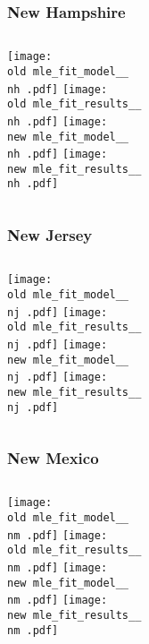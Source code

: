 \documentclass{beamer}
\newcommand{\old}{api-370-prod/pyseir/state_summaries/reports/}
\newcommand{\new}{new/pyseir/state_summaries/reports/}
\newcommand{\nh}{New Hampshire__33}
\newcommand{\nj}{New Jersey__34}
\newcommand{\nm}{New Mexico__35}
\begin{document}
\begin{frame}
\frametitle{New Hampshire}
    \begin{columns}[t]

       \texttt{[image: \\old mle\_fit\_model\_\_\\nh .pdf]}
       \texttt{[image: \\old mle\_fit\_results\_\_\\nh .pdf]}   
       \texttt{[image: \\new mle\_fit\_model\_\_\\nh .pdf]}
       \texttt{[image: \\new mle\_fit\_results\_\_\\nh .pdf]}   
\end{columns}
\end{frame}

\begin{frame}
\frametitle{New Jersey}
    \begin{columns}[t]

       \texttt{[image: \\old mle\_fit\_model\_\_\\nj .pdf]}
       \texttt{[image: \\old mle\_fit\_results\_\_\\nj .pdf]}   
       \texttt{[image: \\new mle\_fit\_model\_\_\\nj .pdf]}
       \texttt{[image: \\new mle\_fit\_results\_\_\\nj .pdf]}   
\end{columns}
\end{frame}

\begin{frame}
\frametitle{New Mexico}
    \begin{columns}[t]

       \texttt{[image: \\old mle\_fit\_model\_\_\\nm .pdf]}
       \texttt{[image: \\old mle\_fit\_results\_\_\\nm .pdf]}   
       \texttt{[image: \\new mle\_fit\_model\_\_\\nm .pdf]}
       \texttt{[image: \\new mle\_fit\_results\_\_\\nm .pdf]}   
\end{columns}
\end{frame}
\end{document}
